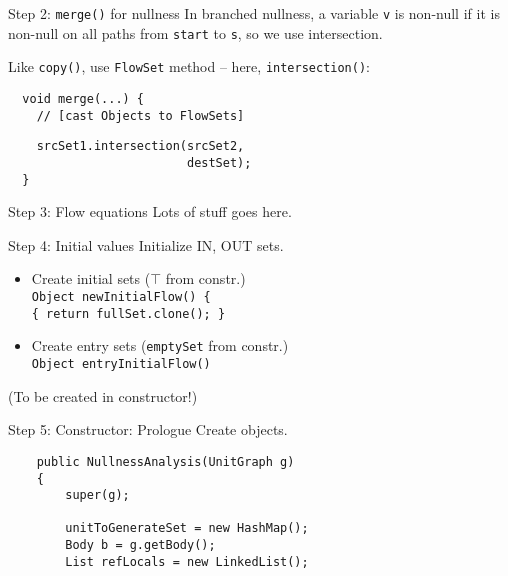 \begin{slide}{Step 2: {\tt merge()} for nullness}
In branched nullness, a variable {\tt v} is non-null if it is non-null
on all paths from {\tt start} to {\tt s}, so we use intersection.

\qquad

Like {\tt copy()}, use {\tt FlowSet} method -- here, {\tt intersection()}:

\vspace*{0.05in}

\begin{verbatim}
  void merge(...) {
    // [cast Objects to FlowSets]
\end{verbatim}
{\red\verb+    srcSet1.intersection(srcSet2,+\\
     \verb+                         destSet);+}\\
\verb+  }+

\end{slide}


\begin{slide}{Step 3: Flow equations}
\vspace*{-0.1in}
Lots of stuff goes here.
\end{slide}

\begin{slide}{Step 4: Initial values}
\vspace*{-0.1in}
Initialize IN, OUT sets.
\begin{itemize}

\item Create initial sets ($\top$ from constr.)\\
{\tt Object newInitialFlow() \{\\
\qquad \tt \{ return fullSet.clone(); \} }

\vspace*{0.1in}

\item Create entry sets ({\tt emptySet} from constr.)\\
{\tt Object entryInitialFlow()}\\
\end{itemize}

(To be created in constructor!)
\end{slide}

\begin{slide}{Step 5: Constructor: Prologue}
\vspace*{-0.1in}
Create objects.
\vspace*{0.05in}
\begin{verbatim}
    public NullnessAnalysis(UnitGraph g)
    {
        super(g);

        unitToGenerateSet = new HashMap();
        Body b = g.getBody();
        List refLocals = new LinkedList();
\end{verbatim}
\end{slide}

